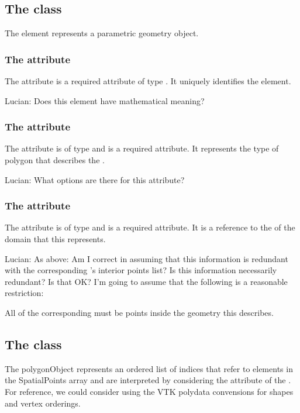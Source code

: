 \subsection{The  class}
\label{ParametricObject-class}
The \ParametricObject element represents a parametric geometry object. 

\subsubsection{The  attribute}
The  attribute is a required attribute of type . It uniquely identifies the \ParametricObject element.

{\color{red} Lucian: \notice Does this element have mathematical meaning?}

\subsubsection{The  attribute}
The  attribute is of type  and is a required attribute. It represents the type of polygon that describes the \ParametricObject.

{\color{red} Lucian: \notice What options are there for this attribute?}

\subsubsection{The  attribute}
The  attribute is of type  and is a required attribute. It is a reference to the  of the domain that this \ParametricObject represents.

{\color{red} Lucian: \notice As above:  Am I correct in assuming that this information is redundant with the corresponding \Domain's interior points list?  Is this information necessarily redundant?  Is that OK?  I'm going to assume that the following is a reasonable restriction:}

All \InteriorPoints of the corresponding \Domain must be points inside the geometry this \ParametricObject describes.


\subsection{The  class}
\label{PolygonObject-class}
The polygonObject represents an ordered list of indices that refer to elements in the SpatialPoints array and are interpreted by considering the  attribute of the \ParametricObject.  For reference, we could consider using the VTK polydata convensions for shapes and vertex orderings.

